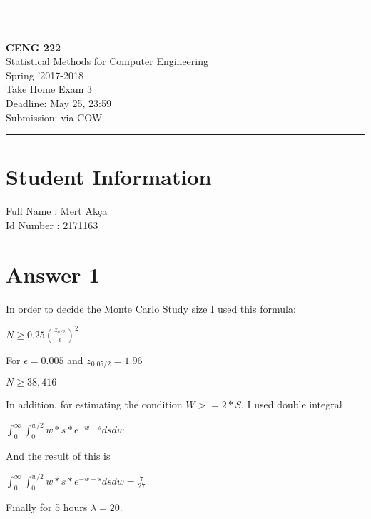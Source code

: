 \documentclass[12pt]{article}
\newcommand{\HRule}{\rule{\linewidth}{1mm}}
\begin{document}
\noindent
\HRule \\[3mm]
\begin{flushright}

                                         \LARGE \textbf{CENG 222}  \\[4mm]
                                         \Large Statistical Methods for Computer Engineering \\[4mm]
                                        \normalsize      Spring '2017-2018 \\
                                           \Large   Take Home Exam 3 \\
                    \normalsize Deadline: May 25, 23:59 \\
                    \normalsize Submission: via COW
\end{flushright}
\HRule

\section*{Student Information }
Full Name : Mert Akça  \\
Id Number : 2171163 \\

\section*{Answer 1}

In order to decide the Monte Carlo Study size I used this formula:
\begin{center}
    $N \ge 0.25 (\frac{z_{a/2}}{\epsilon})^2$
\end{center}
For $\epsilon = 0.005$ and $z_{0.05/2} = 1.96$
\begin{center}
    $N \ge 38,416$
\end{center}
In addition, for estimating the condition $W >= 2*S$, I used double integral
\begin{center}
    $\int_0^{\infty}\int_0^{w/2} w*s*e^{-w-s} dsdw$
\end{center}
And the result of this is
\begin{center}
    $\int_0^{\infty}\int_0^{w/2} w*s*e^{-w-s} dsdw = \frac{7}{27}$
\end{center}

\noindent Finally for 5 hours $ \lambda = 20$.\\
\end{document}
